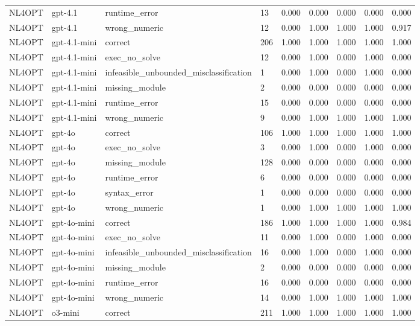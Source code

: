 \begin{table}[t]
\begin{tabular}{lllllllll}
NL4OPT & gpt-4.1 & runtime\_error & 13 & 0.000 & 0.000 & 0.000 & 0.000 & 0.000 \\
NL4OPT & gpt-4.1 & wrong\_numeric & 12 & 0.000 & 1.000 & 1.000 & 1.000 & 0.917 \\
NL4OPT & gpt-4.1-mini & correct & 206 & 1.000 & 1.000 & 1.000 & 1.000 & 1.000 \\
NL4OPT & gpt-4.1-mini & exec\_no\_solve & 12 & 0.000 & 1.000 & 0.000 & 1.000 & 0.000 \\
NL4OPT & gpt-4.1-mini & infeasible\_unbounded\_misclassification & 1 & 0.000 & 1.000 & 0.000 & 1.000 & 0.000 \\
NL4OPT & gpt-4.1-mini & missing\_module & 2 & 0.000 & 0.000 & 0.000 & 0.000 & 0.000 \\
NL4OPT & gpt-4.1-mini & runtime\_error & 15 & 0.000 & 0.000 & 0.000 & 0.000 & 0.000 \\
NL4OPT & gpt-4.1-mini & wrong\_numeric & 9 & 0.000 & 1.000 & 1.000 & 1.000 & 1.000 \\
NL4OPT & gpt-4o & correct & 106 & 1.000 & 1.000 & 1.000 & 1.000 & 1.000 \\
NL4OPT & gpt-4o & exec\_no\_solve & 3 & 0.000 & 1.000 & 0.000 & 1.000 & 0.000 \\
NL4OPT & gpt-4o & missing\_module & 128 & 0.000 & 0.000 & 0.000 & 0.000 & 0.000 \\
NL4OPT & gpt-4o & runtime\_error & 6 & 0.000 & 0.000 & 0.000 & 0.000 & 0.000 \\
NL4OPT & gpt-4o & syntax\_error & 1 & 0.000 & 0.000 & 0.000 & 0.000 & 0.000 \\
NL4OPT & gpt-4o & wrong\_numeric & 1 & 0.000 & 1.000 & 1.000 & 1.000 & 1.000 \\
NL4OPT & gpt-4o-mini & correct & 186 & 1.000 & 1.000 & 1.000 & 1.000 & 0.984 \\
NL4OPT & gpt-4o-mini & exec\_no\_solve & 11 & 0.000 & 1.000 & 0.000 & 1.000 & 0.000 \\
NL4OPT & gpt-4o-mini & infeasible\_unbounded\_misclassification & 16 & 0.000 & 1.000 & 0.000 & 1.000 & 0.000 \\
NL4OPT & gpt-4o-mini & missing\_module & 2 & 0.000 & 0.000 & 0.000 & 0.000 & 0.000 \\
NL4OPT & gpt-4o-mini & runtime\_error & 16 & 0.000 & 0.000 & 0.000 & 0.000 & 0.000 \\
NL4OPT & gpt-4o-mini & wrong\_numeric & 14 & 0.000 & 1.000 & 1.000 & 1.000 & 1.000 \\
NL4OPT & o3-mini & correct & 211 & 1.000 & 1.000 & 1.000 & 1.000 & 1.000 \\

\end{tabular}
\end{table}
